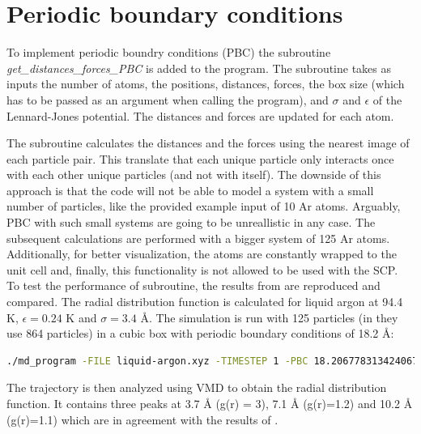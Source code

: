 \documentclass{cis320}
\begin{document}
\section{Periodic boundary conditions}

To implement periodic boundry conditions (PBC) the subroutine \textit{get\_distances\_forces\_PBC} is added to the program. The subroutine takes as inputs the number of atoms, the positions, distances, forces, the box size (which has to be passed as an argument when calling the program), and $\sigma$ and $\epsilon$ of the Lennard-Jones potential. The distances and forces are updated for each atom.\\
\par
The subroutine calculates the distances and the forces using the nearest image of each particle pair. This translate that each unique particle only interacts once with each other unique particles (and not with itself). The downside of this approach is that the code will not be able to model a system with a small number of particles, like the provided example input of 10 Ar atoms. Arguably, PBC with such small systems are going to be unreallistic in any case. The subsequent calculations are performed with a bigger system of 125 Ar atoms.\\
Additionally, for better visualization, the atoms are constantly wrapped to the unit cell and, finally, this functionality is not allowed to be used with the SCP.\\

To test the performance of subroutine, the results from \cite{rahman1964correlations} are reproduced and compared. The radial distribution function is calculated for liquid argon at 94.4 K, $\epsilon=0.24$ K and $\sigma=3.4$ Å. The simulation is run with 125 particles (in \cite{rahman1964correlations} they use 864 particles) in a cubic box with periodic boundary conditions of 18.2 Å:

\begin{lstlisting}[language=bash]
    ./md_program -FILE liquid-argon.xyz -TIMESTEP 1 -PBC 18.206778313424067 -SAVEFREQ 100 -MAX_MD_STEPS 10000 -THERMO BEREN 2 -TEMP 94.4 -EPS 0.23846451108000002 -SIGMA 3.4 \end{lstlisting}

The trajectory is then analyzed using VMD to obtain the radial distribution function. It contains three peaks at 3.7 Å (g(r) = 3), 7.1 Å (g(r)=1.2) and 10.2 Å (g(r)=1.1) which are in agreement with the results of \cite{rahman1964correlations}.
\end{document}
